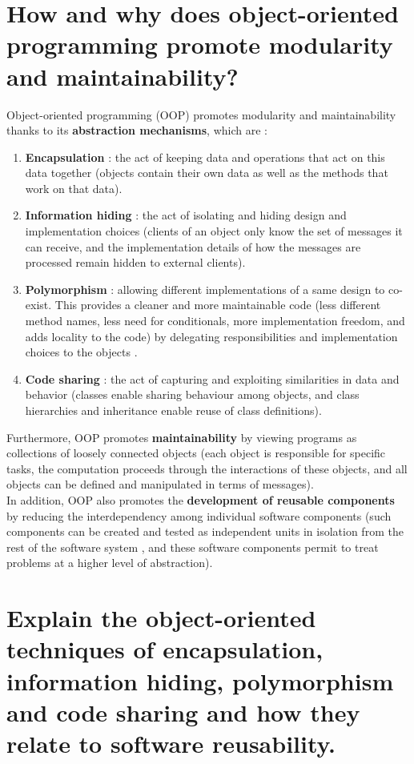 \section{How and why does object-oriented programming promote modularity and maintainability?}

Object-oriented programming (OOP) promotes modularity and maintainability thanks to its \textbf{abstraction mechanisms}, which are :
\begin{enumerate}
\item \textbf{Encapsulation} : the act of keeping data and operations that act on this data together (objects contain their own data as well as the methods that work on that data).
\item \textbf{Information hiding} : the act of isolating and hiding design and implementation choices (clients of an object only know the set of messages it can receive, and the implementation details of how the messages are processed remain hidden to external clients).
\item \textbf{Polymorphism} : allowing different implementations of a same design to co-exist. This provides a cleaner and more maintainable code (less different method names, less need for conditionals, more implementation freedom, and adds locality to the code)  by delegating responsibilities and implementation choices to the objects .
\item \textbf{Code sharing} : the act of capturing and exploiting similarities in data and behavior (classes enable sharing behaviour among objects, and class hierarchies and inheritance enable reuse of class definitions).
\end{enumerate}
Furthermore, OOP promotes \textbf{maintainability} by viewing programs as collections of loosely connected objects (each object is responsible for specific tasks, the computation proceeds through the interactions of these objects, and all objects can be defined and manipulated in terms of messages).\\
In addition, OOP also promotes the \textbf{development of reusable components} by reducing the interdependency among individual software components (such components can be created and tested as independent units in isolation from the rest of the software system , and these software components permit to treat problems at a higher level of abstraction).


\section{Explain the object-oriented techniques of encapsulation, information hiding, polymorphism
and code sharing and how they relate to software reusability.}

